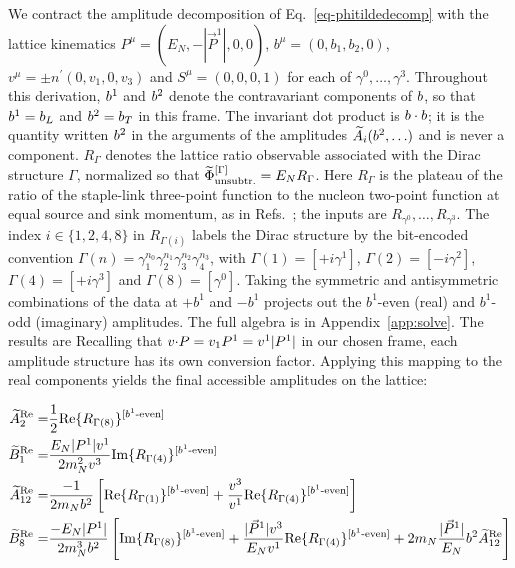 We contract the amplitude decomposition of Eq.~\eqref{eq-phitildedecomp} with the lattice kinematics $P^\mu=(E_N,-|\vec P^1|,0,0)$, $b^\mu=(0,b_1,b_2,0)$, $v^\mu=\pm n^\prime(0,v_1,0,v_3)$ and $S^\mu=(0,0,0,1)$ for each of $\gamma^0,\ldots,\gamma^3$. Throughout this derivation, $b^1$ and $b^2$ denote the contravariant components of $b$, so that $b^1=b_L$ and $b^2=b_T$ in this frame. The invariant dot product is $b\cdot b$; it is the quantity written $b^2$ in the arguments of the amplitudes $\widetilde{A}_i(b^2,\ldots)$ and is never a component. $R_{\Gamma}$ denotes the lattice ratio observable associated with the Dirac structure $\Gamma$, normalized so that $\widetilde\Phi^{[\Gamma]}_{\text{unsubtr.}}=E_N R_\Gamma$. Here $R_\Gamma$ is the plateau of the ratio of the staple-link three-point function to the nucleon two-point function at equal source and sink momentum, as in Refs.~\cite{MuschThesis2,Musch:2011er}; the inputs are $R_{\gamma^0},\ldots,R_{\gamma^3}$.
The index $i\in\{1,2,4,8\}$ in $R_{\Gamma(i)}$ labels the Dirac structure by the bit-encoded convention $\Gamma(n)=\gamma_1^{n_0}\gamma_2^{n_1}\gamma_3^{n_2}\gamma_4^{n_3}$, with $\Gamma(1)=[+i\gamma^1]$, $\Gamma(2)=[-i\gamma^2]$, $\Gamma(4)=[+i\gamma^3]$ and $\Gamma(8)=[\gamma^0]$. Taking the symmetric and antisymmetric combinations of the data at $+b^1$ and $-b^1$ projects out the $b^1$-even (real) and $b^1$-odd (imaginary) amplitudes. The full algebra is in Appendix~\ref{app:solve}. The results are
Recalling that $v {\cdot} P = v_1 P^1 = v^1 |P^1|$ in our chosen frame, each amplitude structure has its own conversion factor. Applying this mapping to the real components yields the final accessible amplitudes on the lattice:
\begin{widetext}
\begin{align}
    \widetilde{A}^{\text{Re}}_2 = & \frac{1}{2}\text{Re}\{ R_{\Gamma(8)}\}^{[b^{1}\text{-even}]} \\
    \widetilde{B}^{\text{Re}}_1 = & \frac{E_{N}|P^1|v^1}{2m_N^2  v^3} \text{Im}\{ R_{\Gamma(4)}\}^{[b^{1}\text{-even}]}\\
    \widetilde{A}^{\text{Re}}_{12}=&\frac{-1}{2m_N  b^2}\left[\text{Re}\{ R_{\Gamma(1)}\}^{[b^{1}\text{-even}]}+\frac{v^3}{v^1}\text{Re}\{ R_{\Gamma(4)}\}^{[b^{1}\text{-even}]}\right]\\
    \widetilde{B}^{\text{Re}}_8=&\frac{-E_N |P^1|}{ 2m_N^3 b^2 }\left[\text{Im}\{ R_{\Gamma(8)}\}^{[b^{1}\text{-even}]}+\frac{|\vec{P}^1|v^3}{E_N v^1}\text{Re}\{ R_{\Gamma(4)}\}^{[b^{1}\text{-even}]}+ 2m_N  \frac{|\vec{P}^1|}{E_N} b^2  \widetilde{A}^{\text{Re}}_{12}\right]
\end{align}
\end{widetext}
